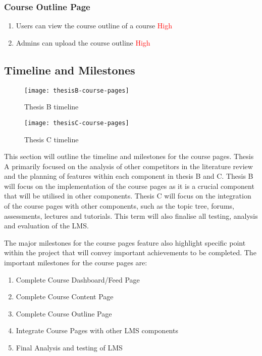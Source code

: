 \subsubsection{Course Outline Page}
\begin{enumerate}
    \item Users can view the course outline of a course \textcolor{Red}{High}
    \item Admins can upload the course outline \textcolor{Red}{High}
\end{enumerate}

\subsection{Timeline and Milestones}
\begin{figure}[h]
    \centering
    \texttt{[image: thesisB-course-pages]}
    \caption{Thesis B timeline}
\end{figure}

\begin{figure}[h]
    \centering
    \texttt{[image: thesisC-course-pages]}
    \caption{Thesis C timeline}
\end{figure}
This section will outline the timeline and milestones for the course pages.
Thesis A primarily focused on the analysis of other competitors in the literature review and the planning of features within each component in thesis B and C.
Thesis B will focus on the implementation of the course pages as it is a crucial component that will be utilised in other components.
Thesis C will focus on the integration of the course pages with other components, such as the topic tree, forums, assessments, lectures and tutorials.
This term will also finalise all testing, analysis and evaluation of the LMS.

The major milestones for the course pages feature also highlight specific point within the project that will convey important achievements to be completed.
The important milestones for the course pages are:
\begin{enumerate}
    \item Complete Course Dashboard/Feed Page
    \item Complete Course Content Page
    \item Complete Course Outline Page
    \item Integrate Course Pages with other LMS components
    \item Final Analysis and testing of LMS
\end{enumerate}

